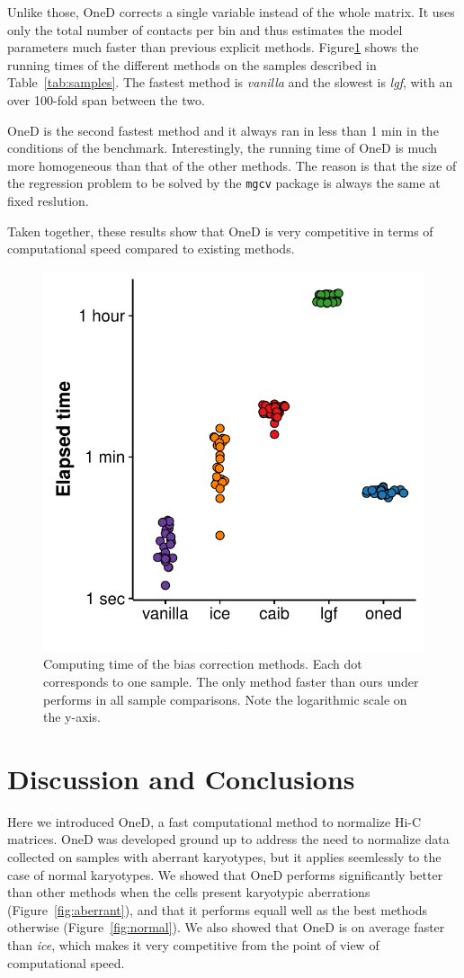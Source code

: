 \documentclass{bioinfo}
\begin{document}
Unlike those, OneD corrects a single variable instead of the whole matrix.
It uses only the total number of contacts per bin and thus estimates the
model parameters much faster than previous explicit methods.
Figure\ref{fig:times} shows the running times of the different methods on
the samples described in Table~\ref{tab:samples}. The fastest method is
\textit{vanilla} and the slowest is \textit{lgf}, with an over 100-fold
span between the two.

OneD is the second fastest method and it always ran in less than 1 min in
the conditions of the benchmark. Interestingly, the running time of OneD
is much more homogeneous than that of the other methods. The reason is
that the size of the regression problem to be solved by the \texttt{mgcv}
package is always the same at fixed reslution.

Taken together, these results show that OneD is very competitive in terms
of computational speed compared to existing methods.

\begin{figure}
\centerline{\includegraphics[width=.35\textwidth]{img/times_sina_figure5.pdf}}
\caption{
Computing time of the bias correction methods. Each dot corresponds to
one sample. The only method faster than ours under performs in all sample
comparisons. Note the logarithmic scale on the y-axis.}
\label{fig:times}
\end{figure}






\section{Discussion and Conclusions}

Here we introduced OneD, a fast computational method to normalize Hi-C
matrices. OneD was developed ground up to address the need to normalize
data collected on samples with aberrant karyotypes, but it applies
seemlessly to the case of normal karyotypes. We showed that OneD performs
significantly better than other methods when the cells present karyotypic
aberrations (Figure~\ref{fig:aberrant}), and that it performs equall well
as the best methods otherwise (Figure~\ref{fig:normal}). We also showed
that OneD is on average faster than \textit{ice}, which makes it very
competitive from the point of view of computational speed.
\end{document}
